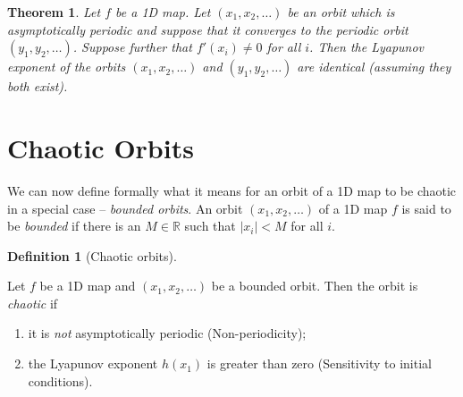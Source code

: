 \documentclass[
  a4paper,
  oneside,
  final]{krantz}
\providecommand{\tightlist}{%
  \setlength{\itemsep}{0pt}\setlength{\parskip}{0pt}}
\newcommand{\R}{\mathbb{R}}
\newtheorem{theorem}{Theorem}[chapter]
\theoremstyle{definition}
\newtheorem{definition}{Definition}[chapter]
\theoremstyle{definition}
\theoremstyle{definition}
\theoremstyle{definition}
\theoremstyle{remark}
\begin{document}
\begin{theorem}
\protect\hypertarget{thm:asymptociallyperiodicsamelyapunov}{}\label{thm:asymptociallyperiodicsamelyapunov}Let \(f\) be a 1D map. Let \((x_1, x_2, \ldots)\) be an orbit which is asymptotically periodic and suppose that it converges to the periodic orbit \((y_1, y_2, \ldots)\). Suppose further that \(f'(x_i) \ne 0\) for all \(i\). Then the Lyapunov exponent of the orbits \((x_1, x_2, \ldots)\) and \((y_1, y_2, \ldots)\) are identical (assuming they both exist).
\end{theorem}

\hypertarget{chaoticorbits}{%
\section{Chaotic Orbits}\label{chaoticorbits}}

We can now define formally what it means for an orbit of a 1D map to be chaotic in a special case -- \emph{bounded orbits}. An orbit \((x_1, x_2, \ldots)\) of a 1D map \(f\) is said to be \emph{bounded} if there is an \(M \in \R\) such that \(|x_i| < M\) for all \(i\).

\begin{definition}[Chaotic orbits]
\protect\hypertarget{def:defchaoticorbits}{}\label{def:defchaoticorbits}

Let \(f\) be a 1D map and \((x_1, x_2, \ldots)\) be a bounded orbit. Then the orbit is \emph{chaotic} if

\begin{enumerate}
\def\labelenumi{\arabic{enumi}.}
\tightlist
\item
  it is \emph{not} asymptotically periodic (Non-periodicity);
\item
  the Lyapunov exponent \(h(x_1)\) is greater than zero (Sensitivity to initial conditions).
\end{enumerate}

\end{definition}
\end{document}
